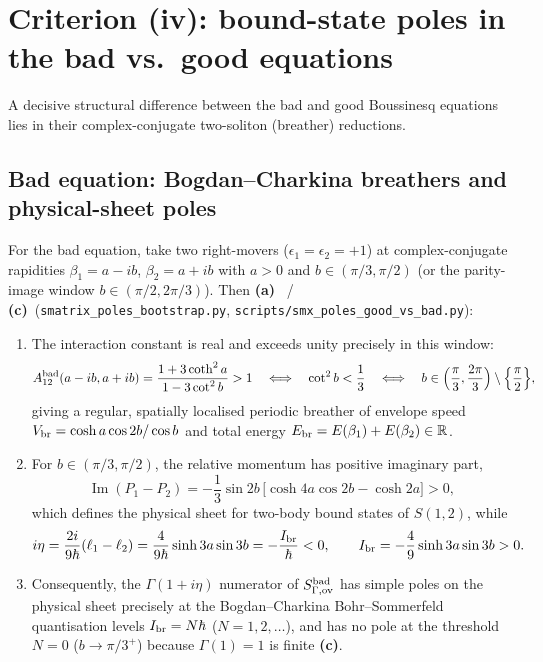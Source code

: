 \documentclass[11pt,a4paper]{article}
\newcommand{\La}{\textsf{\textbf{(a)}}}
\newcommand{\Lc}{\textsf{\textbf{(c)}}}
\newcommand{\script}[1]{\texttt{scripts/\allowbreak #1}}
\theoremstyle{remark}
\begin{document}
\section{Criterion (iv): bound-state poles in the bad vs.\ good equations}\label{sec:poles}

A decisive structural difference between the bad and good Boussinesq equations lies in their complex-conjugate two-soliton (breather) reductions.

\subsection{Bad equation: Bogdan--Charkina breathers and physical-sheet poles}
For the bad equation, take two right-movers ($\epsilon_1=\epsilon_2=+1$) at complex-conjugate rapidities $\beta_1=a-ib$, $\beta_2=a+ib$ with $a>0$ and $b\in(\pi/3,\pi/2)$ (or the parity-image window $b\in(\pi/2,2\pi/3)$). Then \La~\cite{BC} / \Lc\ (\texttt{smatrix\_poles\_bootstrap.py}, \script{smx\_poles\_good\_vs\_bad.py}):
\begin{enumerate}
\item The interaction constant is real and exceeds unity precisely in this window:
\begin{equation}\label{eq:A_bad_br}
A_{12}^{\rm bad}(a-ib,a+ib)=\frac{1+3\coth^2 a}{1-3\cot^2 b}>1\quad\Longleftrightarrow\quad \cot^2 b<\frac13\quad\Longleftrightarrow\quad b\in\Bigl(\frac\pi3,\frac{2\pi}{3}\Bigr)\setminus\Bigl\{\frac\pi2\Bigr\},
\end{equation}
giving a regular, spatially localised periodic breather of envelope speed $V_{\rm br}=\cosh a\cos 2b/\cos b$ and total energy $E_{\rm br}=E(\beta_1)+E(\beta_2)\in\mathbb R$.
\item For $b\in(\pi/3,\pi/2)$, the relative momentum has positive imaginary part,
\begin{equation}\label{eq:ImP_bad}
\operatorname{Im}(P_1-P_2)=-\frac13\sin 2b\,\bigl[\cosh 4a\cos 2b-\cosh 2a\bigr]>0,
\end{equation}
which defines the physical sheet for two-body bound states of $S(1,2)$, while
\begin{equation}\label{eq:ieta_bad}
i\eta=\frac{2i}{9\hbar}(\ell_1-\ell_2)=\frac{4}{9\hbar}\sinh 3a\sin 3b=-\frac{I_{\rm br}}{\hbar}<0,\qquad
I_{\rm br}=-\frac49\sinh 3a\sin 3b>0.
\end{equation}
\item Consequently, the $\Gamma(1+i\eta)$ numerator of $S_{\Gamma,\rm ov}^{\rm bad}$ has simple poles on the physical sheet precisely at the Bogdan--Charkina Bohr--Sommerfeld quantisation levels $I_{\rm br}=N\hbar$ ($N=1,2,\dots$), and has no pole at the threshold $N=0$ ($b\to\pi/3^+$) because $\Gamma(1)=1$ is finite \Lc.
\end{enumerate}
\end{document}
